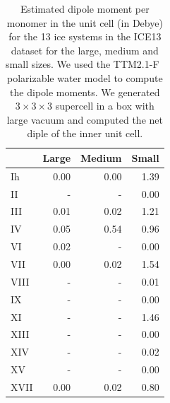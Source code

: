 \begin{table}[h]

\caption{\label{tab:ice13_dipole_moments}Estimated dipole moment per monomer in the unit cell (in Debye) for the 13 ice systems in the ICE13 dataset for the large, medium and small sizes. We used the TTM2.1-F~\cite{fanourgakisFlexiblePolarizableTholetype2006} polarizable water model to compute the dipole moments. We generated $3\times3\times3$ supercell in a box with large vacuum and computed the net diple of the inner unit cell.}
\begin{tabular}{lrrr}
\toprule
 & Large & Medium & Small \\ 
\midrule
Ih & 0.00 & 0.00 & 1.39 \\
II & - & - & 0.00 \\
III & 0.01 & 0.02 & 1.21 \\
IV & 0.05 & 0.54 & 0.96 \\
VI & 0.02 & - & 0.00 \\
VII & 0.00 & 0.02 & 1.54 \\
VIII & - & - & 0.01 \\
IX & - & - & 0.00 \\
XI & - & - & 1.46 \\
XIII & - & - & 0.00 \\
XIV & - & - & 0.02 \\
XV & - & - & 0.00 \\
XVII & 0.00 & 0.02 & 0.80 \\
\bottomrule
\end{tabular}

\end{table}